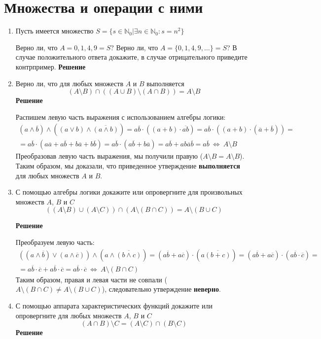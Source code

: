 \documentclass[12pt]{article}
\begin{document}
	\section{Множества и операции с ними}
	\begin{enumerate}[label={\textbf{\arabic{section}.\arabic*}}]
		\item Пусть имеется множество $S = \{s\in\mathbb{N}_0| \exists n\in\mathbb{N}_0: s = n^2\}$
		
		Верно ли, что $A = {0, 1, 4, 9} = S$? Верно ли, что $A = \{0, 1, 4, 9, \dots\} = S$? В случае положительного ответа докажите, в случае отрицательного приведите контрпример.
		\textbf{Решение}
		\item Верно ли, что для любых множеств $A$ и  $B$ выполняется
		$$
		(A\setminus B)\cap ((A\cup B)\setminus (A\cap B)) = A\setminus B
		$$
		\textbf{Решение}
		
		Распишем левую часть выражения с использованием алгебры логики:
		\begin{multline*}
			(a\wedge\overline{b})\wedge ((a\vee b)\wedge\overline{(a\wedge b)}) = a\overline{b}\cdot((a + b)\cdot\overline{ab}) = a\overline{b}\cdot((a+b)\cdot(\overline{a}+\overline{b})) = \\
			= a\overline{b}\cdot(a\overline{a}+a\overline{b}+b\overline{a}+b\overline{b}) = a\overline{b}\cdot(a\overline{b}+b\overline{a}) = a\overline{b} + ab\overline{a}\overline{b} = a\overline{b} ~\Leftrightarrow~ A\setminus B
		\end{multline*}
		Преобразовав левую часть выражения, мы получили правую ($A\setminus B = A\setminus B$). Таким образом, мы доказали, что приведенное утверждение \textbf{выполняется} для любых множеств $A$ и $B$.
		\item С помощью алгебры логики докажите или опровергните для произвольных множеств $A$, $B$ и $C$
		$$
		((A\setminus B)\cup(A\setminus C))\cap (A\setminus(B\cap C)) = A\setminus (B\cup C)
		$$
		
		\textbf{Решение}
		
		Преобразуем левую часть:
		\begin{multline*}
			((a\wedge\overline{b})\vee(a\wedge\overline{c}))\wedge (a\wedge\overline{(b\wedge c)}) = (a\overline{b} + a\overline{c})\cdot(a\overline{(b+c)}) = (a\overline{b} + a\overline{c})\cdot(a\overline{b}\cdot\overline{c}) = \\
			= a\overline{b}\cdot\overline{c} + a\overline{b}\cdot\overline{c} = a\overline{b}\cdot\overline{c} ~\Leftrightarrow~ A\setminus(B\cap C)
		\end{multline*}
		Таким образом, правая и левая части не совпали ($A\setminus(B\cap C) \neq A\setminus (B\cup C)$), следовательно утверждение \textbf{неверно}.
		\item С помощью аппарата характеристических функций докажите или опровергните для любых множеств $A$, $B$ и $C$
		$$
		(A\cap B)\setminus C = (A\setminus C)\cap (B\setminus C)
		$$
		\textbf{Решение}
		

\end{enumerate}
\end{document}
